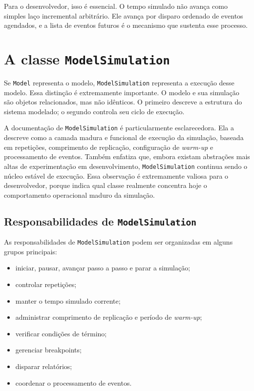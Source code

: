Para o desenvolvedor, isso é essencial. O tempo simulado não avança como simples laço incremental arbitrário. Ele avança por disparo ordenado de eventos agendados, e a lista de eventos futuros é o mecanismo que sustenta esse processo.

\section{A classe \texttt{ModelSimulation}}
\label{sec:cap7_classe_modelsimulation}

Se \texttt{Model} representa o modelo, \texttt{ModelSimulation} representa a execução desse modelo. Essa distinção é extremamente importante. O modelo e sua simulação são objetos relacionados, mas não idênticos. O primeiro descreve a estrutura do sistema modelado; o segundo controla seu ciclo de execução.

A documentação de \texttt{ModelSimulation} é particularmente esclarecedora. Ela a descreve como a camada madura e funcional de execução da simulação, baseada em repetições, comprimento de replicação, configuração de \textit{warm-up} e processamento de eventos. Também enfatiza que, embora existam abstrações mais altas de experimentação em desenvolvimento, \texttt{ModelSimulation} continua sendo o núcleo estável de execução. Essa observação é extremamente valiosa para o desenvolvedor, porque indica qual classe realmente concentra hoje o comportamento operacional maduro da simulação.

\subsection{Responsabilidades de \texttt{ModelSimulation}}
\label{subsec:cap7_responsabilidades_modelsimulation}

As responsabilidades de \texttt{ModelSimulation} podem ser organizadas em alguns grupos principais:

\begin{itemize}
    \item iniciar, pausar, avançar passo a passo e parar a simulação;
    \item controlar repetições;
    \item manter o tempo simulado corrente;
    \item administrar comprimento de replicação e período de \textit{warm-up};
    \item verificar condições de término;
    \item gerenciar breakpoints;
    \item disparar relatórios;
    \item coordenar o processamento de eventos.
\end{itemize}

